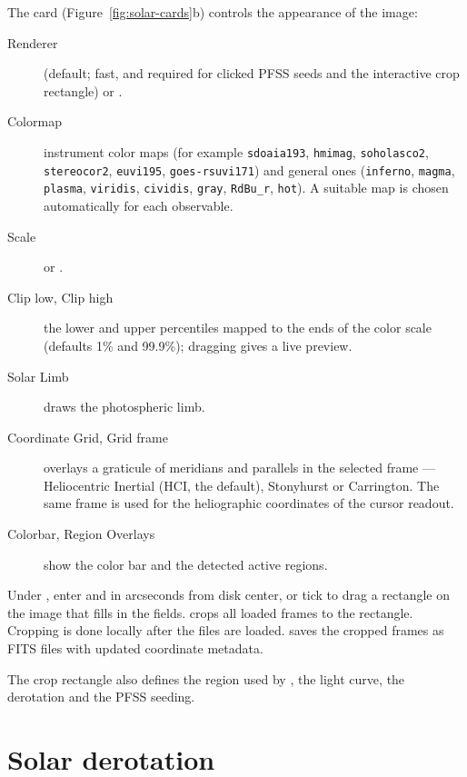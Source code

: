 The  card (Figure~\ref{fig:solar-cards}b) controls the appearance of the image:
\begin{description}
  \item[Renderer]  (default; fast, and required for clicked PFSS seeds and the
    interactive crop rectangle) or .
  \item[Colormap] instrument color maps (for example \texttt{sdoaia193}, \texttt{hmimag},
    \texttt{soholasco2}, \texttt{stereocor2}, \texttt{euvi195}, \texttt{goes-rsuvi171}) and
    general ones (\texttt{inferno}, \texttt{magma}, \texttt{plasma}, \texttt{viridis},
    \texttt{cividis}, \texttt{gray}, \texttt{RdBu\_r}, \texttt{hot}). A suitable map is
    chosen automatically for each observable.
  \item[Scale]  or .
  \item[Clip low, Clip high] the lower and upper percentiles mapped to the ends of the color
    scale (defaults 1\% and 99.9\%); dragging gives a live preview.
  \item[Solar Limb] draws the photospheric limb.
  \item[Coordinate Grid, Grid frame] overlays a graticule of meridians and parallels in the
    selected frame --- Heliocentric Inertial (HCI, the default), Stonyhurst or Carrington. The
    same frame is used for the heliographic coordinates of the cursor readout.
  \item[Colorbar, Region Overlays] show the color bar and the detected active regions.
\end{description}

Under , enter  and  in arcseconds from
disk center, or tick  to drag a rectangle on the image that fills in
the fields.  crops all loaded frames to the rectangle. Cropping is done
locally after the files are loaded.  saves the cropped frames as
FITS files with updated coordinate metadata.

The crop rectangle also defines the region used by , the light curve, the
derotation and the  PFSS seeding.

\section{Solar derotation}
\label{sec:derotation}


